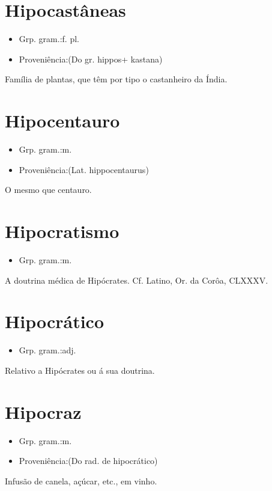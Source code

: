 \documentclass{article}
\begin{document}
\section{Hipocastâneas}
\begin{itemize}
\item {Grp. gram.:f. pl.}
\end{itemize}
\begin{itemize}
\item {Proveniência:(Do gr. \textunderscore hippos\textunderscore  + \textunderscore kastana\textunderscore )}
\end{itemize}
Família de plantas, que têm por tipo o castanheiro da Índia.
\section{Hipocentauro}
\begin{itemize}
\item {Grp. gram.:m.}
\end{itemize}
\begin{itemize}
\item {Proveniência:(Lat. \textunderscore hippocentaurus\textunderscore )}
\end{itemize}
O mesmo que \textunderscore centauro\textunderscore .
\section{Hipocratismo}
\begin{itemize}
\item {Grp. gram.:m.}
\end{itemize}
A doutrina médica de Hipócrates. Cf. Latino, \textunderscore Or. da Corôa\textunderscore , CLXXXV.
\section{Hipocrático}
\begin{itemize}
\item {Grp. gram.:adj.}
\end{itemize}
Relativo a Hipócrates ou á sua doutrina.
\section{Hipocraz}
\begin{itemize}
\item {Grp. gram.:m.}
\end{itemize}
\begin{itemize}
\item {Proveniência:(Do rad. de \textunderscore hipocrático\textunderscore )}
\end{itemize}
Infusão de canela, açúcar, etc., em vinho.
\end{document}
